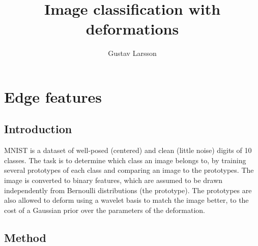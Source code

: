 \documentclass{report}
\begin{document}
\title{Image classification with deformations}

\author{Gustav Larsson}

\maketitle

%
%
%
\chapter{Edge features}

\section{Introduction}
MNIST is a dataset of well-posed (centered) and clean (little noise) digits of 10 classes. The task is to determine which class an image belongs to, by training several prototypes of each class and comparing an image to the prototypes. The image is converted to binary features, which are assumed to be drawn independently from Bernoulli distributions (the prototype).
The prototypes are also allowed to deform using a wavelet basis to match the image better, to the cost of a Gaussian prior over the parameters of the deformation.

\section{Method}

\end{document}
